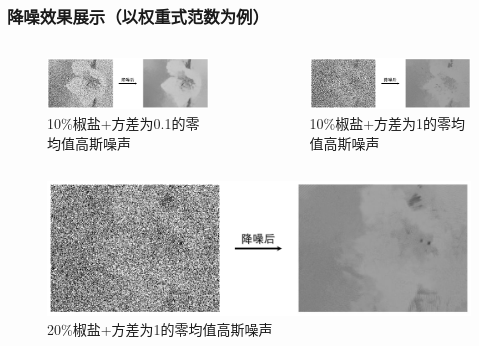 \documentclass[10pt,aspectratio=43,mathserif]{beamer}
\begin{document}
\begin{frame}
\frametitle{\textbf{降噪效果展示（以权重式范数为例）}}
\begin{columns}
\begin{figure}
\centering
\includegraphics[scale=0.25]{Screenshot_9.png}
\caption{10\%椒盐+方差为0.1的零均值高斯噪声}
\end{figure}

\begin{figure}
\centering
\includegraphics[scale=0.25]{Screenshot_10.png}
\caption{10\%椒盐+方差为1的零均值高斯噪声}
\end{figure}
\end{columns}
\begin{figure}
\centering
\includegraphics[scale=0.25]{Screenshot_11.png}
\caption{20\%椒盐+方差为1的零均值高斯噪声}
\end{figure}
\end{frame}
\end{document}
